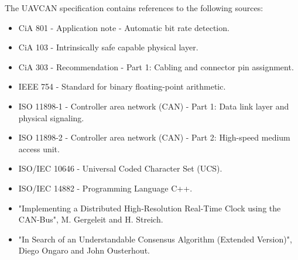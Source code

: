 The UAVCAN specification contains references to the following sources:

\begin{itemize}
    \item CiA 801 - Application note - Automatic bit rate detection.
    \item CiA 103 - Intrinsically safe capable physical layer.
    \item CiA 303 - Recommendation - Part 1: Cabling and connector pin assignment.
    \item IEEE 754 - Standard for binary floating-point arithmetic.
    \item ISO 11898-1 - Controller area network (CAN) - Part 1: Data link layer and physical signaling.
    \item ISO 11898-2 - Controller area network (CAN) - Part 2: High-speed medium access unit.
    \item ISO/IEC 10646 - Universal Coded Character Set (UCS).
    \item ISO/IEC 14882 - Programming Language C++.
    \item "Implementing a Distributed High-Resolution Real-Time Clock using the CAN-Bus", M. Gergeleit and H. Streich.
    \item "In Search of an Understandable Consensus Algorithm (Extended Version)", Diego Ongaro and John Ousterhout.
\end{itemize}
